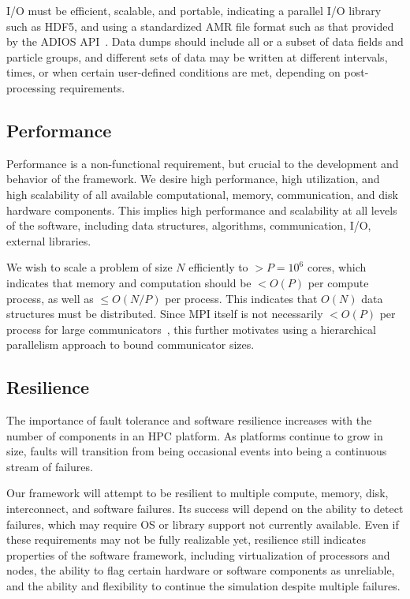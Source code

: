 \documentclass[10pt,twocolumn]{article}
\begin{document}
I/O must be efficient, scalable, and portable, indicating a parallel
I/O library such as HDF5, and using a standardized AMR file format
such as that provided by the ADIOS API~\cite{LoKl08}.  Data dumps
should include all or a subset of data fields and particle groups, and
different sets of data may be written at different intervals, times,
or when certain user-defined conditions are met, depending on
post-processing requirements.

\subsection{Performance}  \label{ss:require-performance}

Performance is a non-functional requirement, but crucial to the
development and behavior of the framework.  We desire high
performance, high utilization, and high scalability of all available
computational, memory, communication, and disk hardware components.
This implies high performance and scalability at all levels of the
software, including data structures, algorithms, communication, I/O,
external libraries.

We wish to scale a problem of size $N$ efficiently to $> P = 10^6$
cores, which indicates that memory and computation should be $< O(P)$
per compute process, as well as $\leq O(N/P)$ per process.  This
indicates that $O(N)$ data structures must be distributed.  Since MPI
itself is not necessarily $< O(P)$ per process for large
communicators~\cite{BaBu09}, this further motivates using a
hierarchical parallelism approach to bound communicator sizes.

\subsection{Resilience} \label{ss:require-resilience}

The importance of fault tolerance and software resilience increases
with the number of components in an HPC platform.  As platforms
continue to grow in size, faults will transition from being occasional
events into being a continuous stream of failures.

Our framework will attempt to be resilient to multiple compute,
memory, disk, interconnect, and software failures.  Its success will
depend on the ability to detect failures, which may require OS or
library support not currently available.  Even if these requirements
may not be fully realizable yet, resilience still indicates properties
of the software framework, including virtualization of processors and
nodes, the ability to flag certain hardware or software components as
unreliable, and the ability and flexibility to continue the simulation
despite multiple failures.
\end{document}
